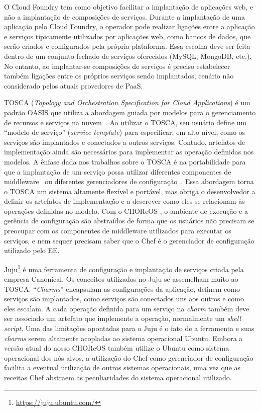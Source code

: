 O Cloud Foundry tem como objetivo facilitar a implantação de aplicações web, e não a implantação de composições de serviços. Durante a implantação de uma aplicação pelo Cloud Foundry, o operador pode realizar ligações entre a aplicação e serviços tipicamente utilizados por aplicações web, como bancos de dados, que serão criados e configurados pela própria plataforma. Essa escolha deve ser feita dentro de um conjunto fechado de serviços oferecidos (MySQL, MongoDB, etc.). No entanto, ao implantar-se composições de serviços é preciso estabelecer também ligações entre os próprios serviços sendo implantados, cenário não considerado pelos atuais provedores de PaaS.

TOSCA (\emph{Topology and Orchestration Specification for Cloud Applications})
é um padrão OASIS que utiliza a abordagem guiada por modelos para
o gerenciamento de recursos e serviços na nuvem~\cite{Wettinger2013Tosca}.
Ao utilizar o TOSCA, seu usuário define um ``modelo de serviço'' (\emph{service template})
para especificar, em alto nível, como os serviços são implantados e conectados a outros serviços.
Contudo, artefatos de implementação ainda são necessários
para implementar as operação definidas nos modelos.
A ênfase dada nos trabalhos sobre o TOSCA é na portabilidade
para que a implantação de um serviço possa utilizar diferentes
componentes de middleware~\cite{Wettinger2013ExtensiblePaaS} 
ou diferentes gerenciadores de configuração~\cite{Wettinger2013Tosca}.
Essa abordagem torna o TOSCA um sistema altamente flexível e portável,
mas obriga o desenvolvedor a definir os
artefatos de implementação e a descrever como eles se
relacionam às operações definidas no modelo.
Com o CHOReOS \ee, o ambiente de execução e a gerência de configuração são
abstraídos de forma que os usuários não precisam se preocupar
com os componentes de middleware utilizados para executar os serviços,
e nem sequer precisam saber que o Chef é o gerenciador de configuração
utilizado pelo EE.

Juju\footnote{\url{https://juju.ubuntu.com/}} é uma ferramenta 
de configuração e implantação de serviços criada pela empresa Canonical.
Os conceitos utilizados no Juju se assemelham muito ao TOSCA.
``\emph{Charms}'' encapsulam as configurações da aplicação,
definem como serviços são implantados, como serviços
são conectados uns aos outros e como eles escalam.
A cada operação definida para um serviço na \emph{charm}
também deve ser associado um artefato que implemente a operação,
normalmente um \emph{shell script}.
Uma das limitações apontadas para o Juju é o fato
de a ferramenta e suas \emph{charms} serem altamente acopladas ao
sistema operacional Ubuntu.
Embora a versão atual do nosso CHOReOS \ee também utilize o Ubuntu
como sistema operacional dos nós alvos,
a utilização do Chef como gerenciador de configuração
facilita a eventual utilização de outros sistemas operacionais,
uma vez que as receitas Chef abstraem as peculiaridades
do sistema operacional utilizado.

